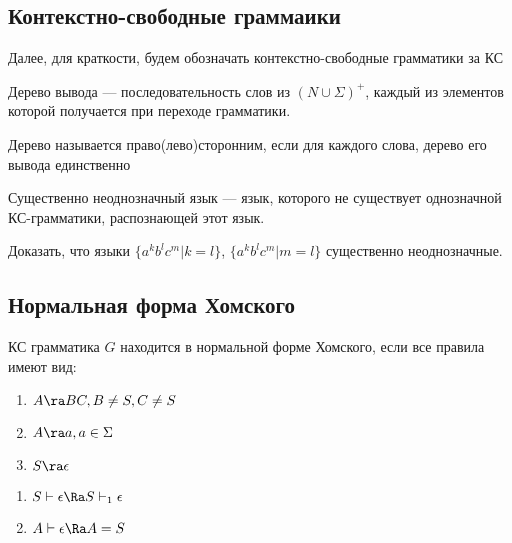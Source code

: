 \subsection{Контекстно-свободные граммаики}

Далее, для краткости, будем обозначать контекстно-свободные грамматики за КС

\begin{definition}
    Дерево вывода --- последовательность слов из \((N \cup \Sigma)^+\), каждый из элементов которой получается при переходе грамматики.
\end{definition}

\begin{definition}
    Дерево называется право(лево)сторонним, если для каждого слова, дерево его вывода единственно
\end{definition}

\begin{definition}
    Существенно неоднозначный язык --- язык, которого не существует однозначной КС-грамматики, распознающей этот язык.
\end{definition}

\begin{problem}
    Доказать, что языки \(\{a^kb^lc^m | k = l\}\), \(\{a^kb^lc^m | m = l\}\) существенно неоднозначные.
\end{problem}

\subsection{Нормальная форма Хомского}

\begin{definition}
    КС грамматика \(G\) находится в нормальной форме Хомского, если все правила имеют вид:
    \begin{enumerate}
        \item \(A \ra BC, B \ne S, C \ne S\)
        \item \(A \ra a, a \in \Sigma\)
        \item \(S \ra \epsilon\)
    \end{enumerate}
\end{definition}
\begin{note}\indent
    \begin{enumerate}
        \item \(S \vdash \epsilon \Ra S \vdash_1 \epsilon\)
        \item \(A \vdash \epsilon \Ra A = S\)
    \end{enumerate}
\end{note}

